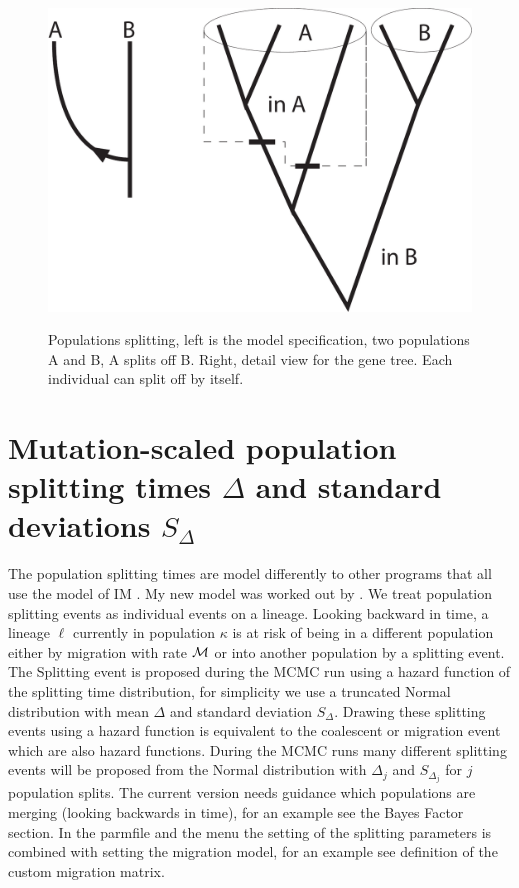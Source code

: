 


\begin{figure}[tbh]
\begin{center}
\leavevmode
\hbox{%
\includegraphics[scale=0.4]{mim/species_manual}}
\end{center}

\caption{Populations splitting, left is the model specification, two populations A and B, A splits off B. Right, detail view for the gene tree. Each individual can split off by itself.}
\label{FIG2}
\end{figure}

\section*{Mutation-scaled population splitting  times $\Delta$ and standard deviations $S_\Delta$}
The population splitting times are model differently to other programs that all use the model of IM \citep{Hey:2010a}.
My new model was worked out by \cite{Palczewski2015}.  We treat population splitting events as individual events on a lineage. Looking backward in time, a lineage $\ell$  currently in population $\kappa$ is at risk of being  in a different population either by migration with rate $\mathcal{M}$ or into another population by a splitting event. The Splitting event is proposed during the MCMC run using a hazard function of the splitting time distribution, for simplicity we use a truncated Normal distribution with mean $\Delta$ and standard deviation $S_\Delta$. Drawing these splitting events using a hazard function is equivalent to the coalescent or migration event which are also hazard functions. During the MCMC runs many different splitting events will be proposed from the Normal distribution with $\Delta_j$ and $S_{\Delta_j}$ for $j$ population splits. The current version needs guidance which populations are merging (looking backwards in time), for an example see the Bayes Factor section.  In the parmfile and the menu the setting of the splitting parameters is combined with setting the migration model, for an example see definition of the custom migration matrix.  


